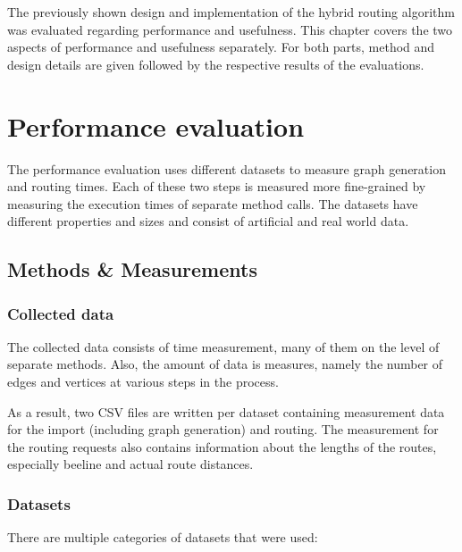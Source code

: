 
The previously shown design and implementation of the hybrid routing algorithm was evaluated regarding performance and usefulness.
This chapter covers the two aspects of performance and usefulness separately.
For both parts, method and design details are given followed by the respective results of the evaluations.

\section{Performance evaluation}

	The performance evaluation uses different datasets to measure graph generation and routing times.
	Each of these two steps is measured more fine-grained by measuring the execution times of separate method calls.
	The datasets have different properties and sizes and consist of artificial and real world data.

	\subsection{Methods \& Measurements}

		\subsubsection{Collected data}
		
			The collected data consists of time measurement, many of them on the level of separate methods.
			Also, the amount of data is measures, namely the number of edges and vertices at various steps in the process.
			
			As a result, two CSV files are written per dataset containing measurement data for the import (including graph generation) and routing.
			The measurement for the routing requests also contains information about the lengths of the routes, especially beeline and actual route distances.
			
		
		\subsubsection{Datasets}
		
			There are multiple categories of datasets that were used:
			
